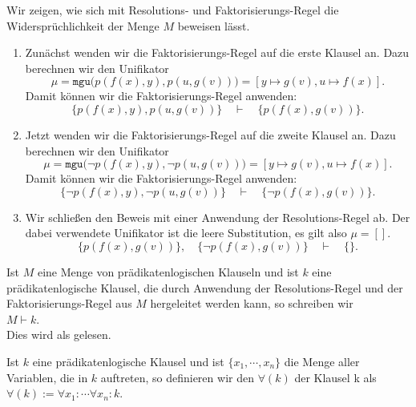 \noindent
Wir zeigen, wie sich mit Resolutions- und Faktorisierungs-Regel die Widersprüchlichkeit
der Menge $M$ beweisen lässt.
\begin{enumerate}
\item Zunächst wenden wir die Faktorisierungs-Regel auf die erste Klausel an. 
      Dazu berechnen wir den Unifikator 
      \[ \mu = \mathtt{mgu}\bigl(p(f(x),y), p(u,g(v))\bigr) = [y \mapsto g(v), u \mapsto f(x)]. \]
      Damit können wir die Faktorisierungs-Regel anwenden: 
      \[ \bigl\{p(f(x),y), p(u,g(v))\bigr\} \quad \vdash \quad \bigl\{p(f(x),g(v))\bigr\}. \]
\item Jetzt wenden wir die Faktorisierungs-Regel auf die zweite Klausel an.
      Dazu berechnen wir  den Unifikator 
      \[ \mu = \mathtt{mgu}\bigl(\neg p(f(x),y), \neg p(u,g(v))\bigr) = [y \mapsto g(v), u \mapsto f(x)]. 
      \]
      Damit können wir die Faktorisierungs-Regel anwenden: 
      \[ \bigl\{ \neg p(f(x),y), \neg p(u,g(v))\bigr\} \quad \vdash \quad \bigl\{\neg p(f(x),g(v))\bigr\}.
      \]
\item Wir schließen den Beweis mit einer Anwendung der Resolutions-Regel ab.
      Der dabei verwendete Unifikator ist die leere Substitution, es gilt also $\mu = []$.      
      \[ \bigl\{p(f(x),g(v))\bigr\}, \quad \bigl\{\neg p(f(x),g(v))\bigr\} \quad \vdash \quad \{\}. \]
\end{enumerate}
Ist $M$ eine Menge von prädikatenlogischen Klauseln und ist $k$ eine prädikatenlogische
Klausel, die durch Anwendung der Resolutions-Regel und der Faktorisierungs-Regel aus $M$
hergeleitet werden kann, so schreiben wir \\[0.2cm]
\hspace*{1.3cm} $M \vdash k$. 
\\[0.2cm]
Dies wird als   gelesen.

\begin{Definition}[Allabschluss] 
  Ist $k$ eine prädikatenlogische Klausel und ist $\{x_1,\cdots,x_n\}$
  die Menge aller Variablen, die in $k$ auftreten, so definieren wir
  den   $\forall(k)$  der Klausel k als \\[0.2cm]
  \hspace*{1.3cm} $\forall(k) := \forall x_1\colon \cdots \forall x_n \colon k$. \eox
\end{Definition}

